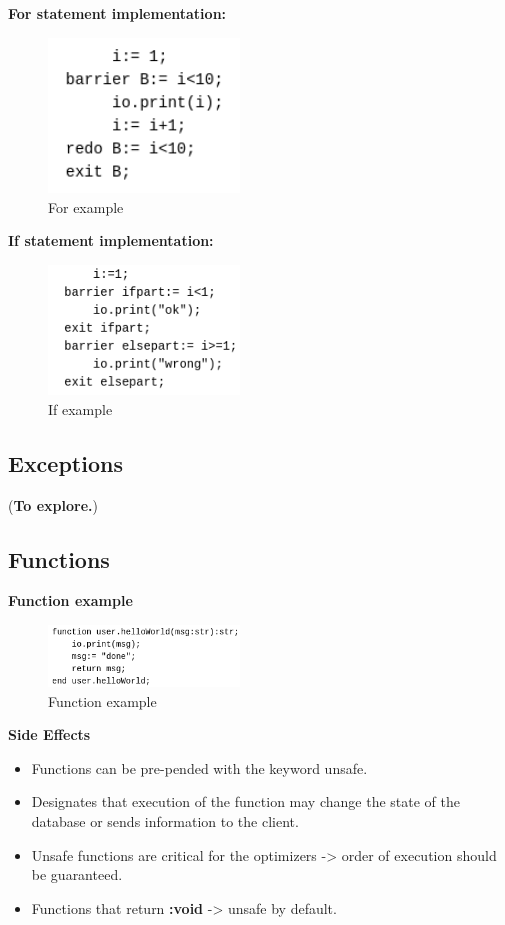 \documentclass[11pt]{article}
\begin{document}
\textbf{For statement implementation:}
\begin{figure}[htbp]
\centering
\includegraphics[width=2.0in]{./Pictures/for-ex.png}
\caption{\label{fig:orge39c174}
For example}
\end{figure}

\textbf{If statement implementation:}
\begin{figure}[htbp]
\centering
\includegraphics[width=2.0in]{./Pictures/if-ex.png}
\caption{\label{fig:orgf89138d}
If example}
\end{figure}

\subsection{Exceptions}
\label{sec:orga06e8da}

(\textbf{To explore.})

\subsection{Functions}
\label{sec:org75c43b9}

\textbf{Function example}
\begin{figure}[htbp]
\centering
\includegraphics[width=2.0in]{./Pictures/fun-ex.png}
\caption{\label{fig:org869270e}
Function example}
\end{figure}

\textbf{Side Effects}
\begin{itemize}
\item Functions can be pre-pended with the keyword unsafe.
\item Designates that execution of the function may change the state of the database or sends information to the client.
\item Unsafe functions are critical for the optimizers -> order of execution should be guaranteed.
\item Functions that return \textbf{:void} -> unsafe by default.
\end{itemize}
\end{document}

